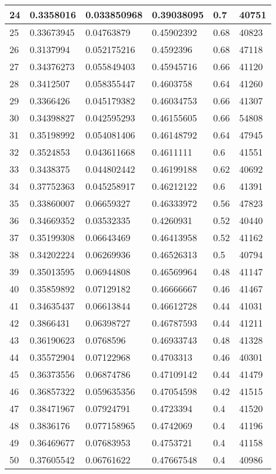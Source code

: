 \begin{longtable}{|l|l|l|l|l|l|}
24 & 0.3358016 & 0.033850968 & 0.39038095 & 0.7 & 40751 \\ \hline 
25 & 0.33673945 & 0.04763879 & 0.45902392 & 0.68 & 40823 \\ \hline 
26 & 0.3137994 & 0.052175216 & 0.4592396 & 0.68 & 47118 \\ \hline 
27 & 0.34376273 & 0.055849403 & 0.45945716 & 0.66 & 41120 \\ \hline 
28 & 0.3412507 & 0.058355447 & 0.4603758 & 0.64 & 41260 \\ \hline 
29 & 0.3366426 & 0.045179382 & 0.46034753 & 0.66 & 41307 \\ \hline 
30 & 0.34398827 & 0.042595293 & 0.46155605 & 0.66 & 54808 \\ \hline 
31 & 0.35198992 & 0.054081406 & 0.46148792 & 0.64 & 47945 \\ \hline 
32 & 0.3524853 & 0.043611668 & 0.4611111 & 0.6 & 41551 \\ \hline 
33 & 0.3438375 & 0.044802442 & 0.46199188 & 0.62 & 40692 \\ \hline 
34 & 0.37752363 & 0.045258917 & 0.46212122 & 0.6 & 41391 \\ \hline 
35 & 0.33860007 & 0.06659327 & 0.46333972 & 0.56 & 47823 \\ \hline 
36 & 0.34669352 & 0.03532335 & 0.4260931 & 0.52 & 40440 \\ \hline 
37 & 0.35199308 & 0.06643469 & 0.46413958 & 0.52 & 41162 \\ \hline 
38 & 0.34202224 & 0.06269936 & 0.46526313 & 0.5 & 40794 \\ \hline 
39 & 0.35013595 & 0.06944808 & 0.46569964 & 0.48 & 41147 \\ \hline 
40 & 0.35859892 & 0.07129182 & 0.46666667 & 0.46 & 41467 \\ \hline 
41 & 0.34635437 & 0.06613844 & 0.46612728 & 0.44 & 41031 \\ \hline 
42 & 0.3866431 & 0.06398727 & 0.46787593 & 0.44 & 41211 \\ \hline 
43 & 0.36190623 & 0.0768596 & 0.46933743 & 0.48 & 41328 \\ \hline 
44 & 0.35572904 & 0.07122968 & 0.4703313 & 0.46 & 40301 \\ \hline 
45 & 0.36373556 & 0.06874786 & 0.47109142 & 0.44 & 41479 \\ \hline 
46 & 0.36857322 & 0.059635356 & 0.47054598 & 0.42 & 41515 \\ \hline 
47 & 0.38471967 & 0.07924791 & 0.4723394 & 0.4 & 41520 \\ \hline 
48 & 0.3836176 & 0.077158965 & 0.4742069 & 0.4 & 41196 \\ \hline 
49 & 0.36469677 & 0.07683953 & 0.4753721 & 0.4 & 41158 \\ \hline 
50 & 0.37605542 & 0.06761622 & 0.47667548 & 0.4 & 40986 \\ \hline 
\end{longtable}